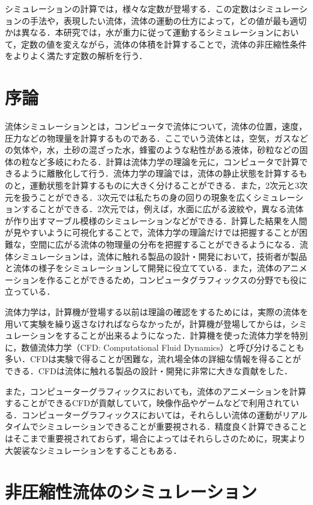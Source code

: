 \documentclass[a4j,12pt]{jreport}
\begin{document}
シミュレーションの計算では，様々な定数が登場する．この定数はシミュレーションの手法や，表現したい流体，流体の運動の仕方によって，どの値が最も適切かは異なる．本研究では，水が重力に従って運動するシミュレーションにおいて，定数の値を変えながら，流体の体積を計算することで，流体の非圧縮性条件をよりよく満たす定数の解析を行う．
\chapter{序論} \label{chapter:2}

流体シミュレーションとは，コンピュータで流体について，流体の位置，速度，圧力などの物理量を計算するものである．ここでいう流体とは，空気，ガスなどの気体や，水，土砂の混ざった水，蜂蜜のような粘性がある液体，砂粒などの固体の粒など多岐にわたる．計算は流体力学の理論を元に，コンピュータで計算できるように離散化して行う．流体力学の理論では，流体の静止状態を計算するものと，運動状態を計算するものに大きく分けることができる．また，2次元と3次元を扱うことができる．3次元では私たちの身の回りの現象を広くシミュレーションすることができる．2次元では，例えば，水面に広がる波紋や，異なる流体が作り出すマーブル模様のシミュレーションなどができる．計算した結果を人間が見やすいように可視化することで，流体力学の理論だけでは把握することが困難な，空間に広がる流体の物理量の分布を把握することができるようになる．流体シミュレーションは，流体に触れる製品の設計・開発において，技術者が製品と流体の様子をシミュレーションして開発に役立てている．また，流体のアニメーションを作ることができるため，コンピュータグラフィックスの分野でも役に立っている．

流体力学は，計算機が登場する以前は理論の確認をするためには，実際の流体を用いて実験を繰り返さなければならなかったが，計算機が登場してからは，シミュレーションをすることが出来るようになった．計算機を使った流体力学を特別に，数値流体力学（CFD: Computational Fluid Dynamics）と呼び分けることも多い．CFDは実験で得ることが困難な，流れ場全体の詳細な情報を得ることができる．CFDは流体に触れる製品の設計・開発に非常に大きな貢献をした．

また，コンピューターグラフィックスにおいても，流体のアニメーションを計算することができるCFDが貢献していて，映像作品やゲームなどで利用されている．コンピューターグラフィックスにおいては，それらしい流体の運動がリアルタイムでシミュレーションできることが重要視される．精度良く計算できることはそこまで重要視されておらず，場合によってはそれらしさのために，現実より大袈裟なシミュレーションをすることもある．
\chapter{非圧縮性流体のシミュレーション} \label{chapter:3}
\end{document}
